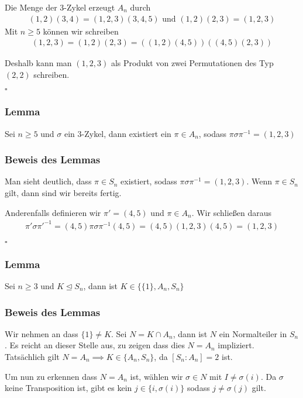 \documentclass[12pt, german]{article}
\newcommand{\bewiesen}{

\begin{flushright}
		$\square$  \\
\end{flushright}}
\begin{document}
	Die Menge der $3$-Zykel erzeugt $A_n$ durch 
	\begin{align*}
		(1,2)(3,4) = (1,2,3)(3,4,5) \text{ und } (1,2)(2,3) = (1,2,3)
	\end{align*}
	Mit $n\geq 5$ können wir schreiben 
	\begin{align*}
		(1,2, 3) = (1,2)(2,3) =((1,2)(4,5))((4,5)(2,3))
	\end{align*}
	
	Deshalb kann man $(1,2,3)$ als Produkt von zwei Permutationen des Typ $(2,2)$ schreiben.
	\bewiesen

\subsubsection{Lemma}
Sei $n \geq 5$ und $\sigma$ ein $3$-Zykel, dann existiert ein $\pi \in A_n$, sodass $\pi\sigma\pi^{-1} = (1,2,3)$

\subsubsection{Beweis des Lemmas}
	Man sieht deutlich, dass $\pi \in S_n$ existiert, sodass $\pi\sigma\pi^{-1} = (1,2,3)$. 
	Wenn $\pi \in S_n$ gilt, dann sind wir bereits fertig. 
	\newline
	
	Anderenfalls definieren wir $\pi' = (4,5)$ und $\pi \in A_n$.  Wir schließen daraus 
		\begin{align*}
			\pi'\sigma\pi'^{-1} = (4,5)\pi\sigma\pi^{-1}(4,5) = (4,5)(1,2,3)(4,5) = (1,2,3)
		\end{align*}
		\bewiesen
		
\subsubsection{Lemma}
	Sei $n \geq 3$ und $K \trianglelefteq S_n$, dann ist $K \in \{ \{1\}, A_n, S_n\}$
	
\subsubsection{Beweis des Lemmas}
	Wir nehmen an dass $\{1\} \not = K$. Sei $N= K \cap A_n$, dann ist $N$ ein Normalteiler in $S_n$. Es reicht an dieser Stelle aus, zu zeigen dass dies $N=A_n$ impliziert. \\ 
	Tatsächlich gilt $N = A_n \implies K \in \{ A_n, S_n\}$, da $[S_n : A_n] = 2$ ist.
	\newline
	
	Um nun zu erkennen dass $N=A_n$ ist, wählen wir $\sigma \in N$ mit $I \not = \sigma(i)$. Da $\sigma$ keine Transposition ist, gibt es kein $j \in \{i, \sigma(i)\}$ sodass $j \not=\sigma(j)$ gilt. \\
	
\end{document}
